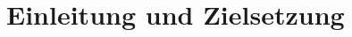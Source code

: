 \documentclass[12pt,oneside,titlepage,listof=totoc,bibliography=totoc]{scrartcl}
\newcommand{\myOrt}{Wilnsdorf}
\begin{document}



\setcounter{page}{1}







\section{Einleitung und Zielsetzung}
\end{document}
